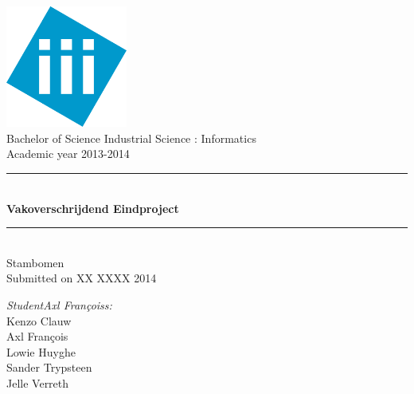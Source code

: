 \documentclass[pdftex,a4paper,12pt,twoside]{report}
\newcommand{\HRule}{\rule{\linewidth}{0.5mm}}
\newcommand{\studenta}{Kenzo Clauw}
\newcommand{\studentb}{Axl Fran\c{c}ois}
\newcommand{\studentc}{Lowie Huyghe}
\newcommand{\studentd}{Sander Trypsteen}
\newcommand{\studente}{Jelle Verreth}
\newcommand{\titel}{Vakoverschrijdend Eindproject}
\newcommand{\ondertitel}{ Stambomen}
\newcommand{\datum}{XX XXXX 2014}
\newcommand{\academiejaar}{2013-2014}
\begin{document}

\begin{titlepage}
\begin{center}
\includegraphics[width=4cm]{images/logo.png}\\[.5cm]
Bachelor of Science Industrial Science : Informatics\\
Academic year \academiejaar

\vfill

\HRule \\[0.4cm]
{ \huge \bfseries \titel}\\[0.4cm]
\HRule \\[0.4cm]

{\Large \ondertitel}\\[0.4cm]

Submitted on \datum

\vfill

\begin{minipage}{0.49\textwidth}
\begin{flushleft}
\emph{Student\ifdefined\studentb s\fi :}\\
\studenta \\
\studentb \\
\studentc \\
\studentd \\
\studente
\par
\end{flushleft}
\end{minipage}
\begin{minipage}{0.49\textwidth}
\begin{flushright}
\end{flushright}
\end{minipage}

\end{center}

\end{titlepage}
\end{document}
